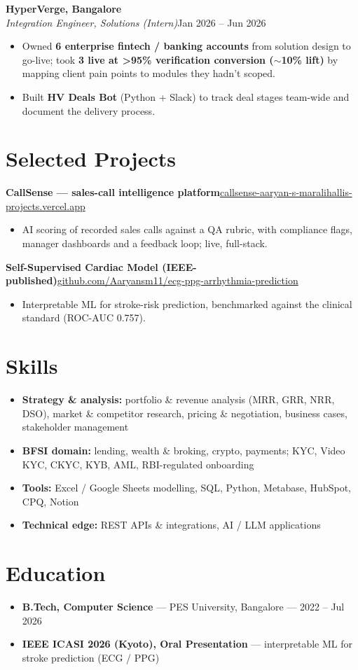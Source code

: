\documentclass[10pt,a4paper]{article}
\begin{document}
\vspace{1pt}\textbf{HyperVerge, Bangalore}\\
\textit{Integration Engineer, Solutions (Intern)}\hfill Jan 2026 -- Jun 2026\par\vspace{1pt}
\begin{itemize}
\item Owned \textbf{6 enterprise fintech / banking accounts} from solution design to go-live; took \textbf{3 live at \textgreater{}95\% verification conversion ($\sim$10\% lift)} by mapping client pain points to modules they hadn't scoped.
\item Built \textbf{HV Deals Bot} (Python + Slack) to track deal stages team-wide and document the delivery process.
\end{itemize}
\section*{Selected Projects}
\vspace{1pt}\textbf{CallSense --- sales-call intelligence platform}\hfill {\small\href{https://callsense-aaryan-s-maralihallis-projects.vercel.app}{callsense-aaryan-s-maralihallis-projects.vercel.app}}
\begin{itemize}
\item AI scoring of recorded sales calls against a QA rubric, with compliance flags, manager dashboards and a feedback loop; live, full-stack.
\end{itemize}
\vspace{1pt}\textbf{Self-Supervised Cardiac Model (IEEE-published)}\hfill {\small\href{https://github.com/Aaryansm11/ecg-ppg-arrhythmia-prediction}{github.com/Aaryansm11/ecg-ppg-arrhythmia-prediction}}
\begin{itemize}
\item Interpretable ML for stroke-risk prediction, benchmarked against the clinical standard (ROC-AUC 0.757).
\end{itemize}
\section*{Skills}
\begin{itemize}
\item \textbf{Strategy \& analysis:} portfolio \& revenue analysis (MRR, GRR, NRR, DSO), market \& competitor research, pricing \& negotiation, business cases, stakeholder management
\item \textbf{BFSI domain:} lending, wealth \& broking, crypto, payments; KYC, Video KYC, CKYC, KYB, AML, RBI-regulated onboarding
\item \textbf{Tools:} Excel / Google Sheets modelling, SQL, Python, Metabase, HubSpot, CPQ, Notion
\item \textbf{Technical edge:} REST APIs \& integrations, AI / LLM applications
\end{itemize}
\section*{Education}
\begin{itemize}
\item \textbf{B.Tech, Computer Science} --- PES University, Bangalore --- 2022 -- Jul 2026
\item \textbf{IEEE ICASI 2026 (Kyoto), Oral Presentation} --- interpretable ML for stroke prediction (ECG / PPG)
\end{itemize}
\end{document}
